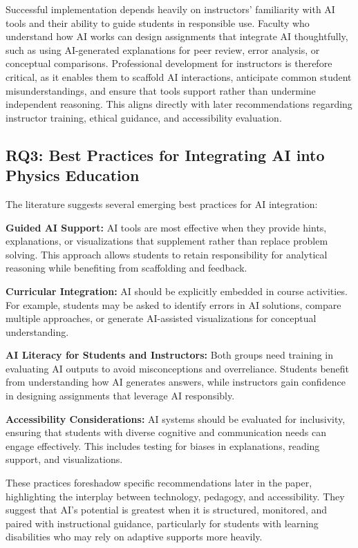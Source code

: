 \documentclass[]{aastex701}
\begin{document}
Successful implementation depends heavily on instructors' familiarity with AI tools and their ability to guide students in responsible use. Faculty who understand how AI works can design assignments that integrate AI thoughtfully, such as using AI-generated explanations for peer review, error analysis, or conceptual comparisons. Professional development for instructors is therefore critical, as it enables them to scaffold AI interactions, anticipate common student misunderstandings, and ensure that tools support rather than undermine independent reasoning. This aligns directly with later recommendations regarding instructor training, ethical guidance, and accessibility evaluation.


\subsection{RQ3: Best Practices for Integrating AI into Physics Education}

The literature suggests several emerging best practices for AI integration:

\textbf{Guided AI Support:} AI tools are most effective when they provide hints, explanations, or visualizations that supplement rather than replace problem solving. This approach allows students to retain responsibility for analytical reasoning while benefiting from scaffolding and feedback.

\textbf{Curricular Integration:} AI should be explicitly embedded in course activities. For example, students may be asked to identify errors in AI solutions, compare multiple approaches, or generate AI-assisted visualizations for conceptual understanding.

\textbf{AI Literacy for Students and Instructors:} Both groups need training in evaluating AI outputs to avoid misconceptions and overreliance. Students benefit from understanding how AI generates answers, while instructors gain confidence in designing assignments that leverage AI responsibly.

\textbf{Accessibility Considerations:} AI systems should be evaluated for inclusivity, ensuring that students with diverse cognitive and communication needs can engage effectively. This includes testing for biases in explanations, reading support, and visualizations.

These practices foreshadow specific recommendations later in the paper, highlighting the interplay between technology, pedagogy, and accessibility. They suggest that AI's potential is greatest when it is structured, monitored, and paired with instructional guidance, particularly for students with learning disabilities who may rely on adaptive supports more heavily.
\end{document}
